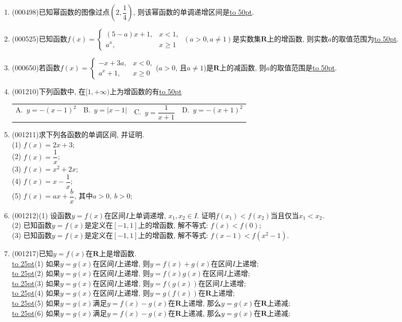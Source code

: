 \documentclass[10pt,a4paper]{article}
\newcommand{\blank}[1]{\underline{\hbox to #1pt{}}}
\newcommand{\fourch}[4]{\par\begin{tabular}{p{.23\textwidth}p{.23\textwidth}p{.23\textwidth}p{.23\textwidth}}
A.~#1 &B.~#2& C.~#3& D.~#4
\end{tabular}}
\begin{document}
\begin{enumerate}[1.]
\item {\tiny (000498)}已知幂函数的图像过点$(2,\dfrac14)$, 则该幂函数的单调递增区间是\blank{50}.
\item {\tiny (000525)}已知函数$f(x)=\begin{cases} (5-a)x+1, & x<1, \\ a^x, & x\ge 1\end{cases} \ (a>0,a\ne 1)$是实数集$\mathbf{R}$上的增函数, 则实数$a$的取值范围为\blank{50}.
\item {\tiny (000650)}若函数$f(x)=\begin{cases} -x+3a, & x<0,  \\ a^x+1, & x\ge 0 \end{cases}$($a>0$, 且$a\ne 1$)是$\mathbf{R}$上的减函数, 则$a$的取值范围是\blank{50}.
\item {\tiny (001210)}下列函数中, 在$[1,+\infty)$上为增函数的有\blank{50}
\fourch{$y=-(x-1)^2$}{$y=|x-1|$}{$y=\dfrac{1}{x+1}$}{$y=-(x+1)^2$}
\item {\tiny (001211)}求下列各函数的单调区间, 并证明.\\ 
(1) $f(x)=2x+3$;\\ 
(2) $f(x)=\dfrac{1}{x}$;\\ 
(3) $f(x)=x^2+2x$;\\ 
(4) $f(x)=x-\dfrac{1}{x}$;\\ 
(5) $f(x)=ax+\dfrac{b}{x}$, 其中$a>0, \ b>0$;
\item {\tiny (001212)}(1) 设函数$y=f(x)$在区间$I$上单调递增, $x_1,x_2\in I$. 证明$f(x_1)<f(x_2)$当且仅当$x_1<x_2$.\\ 
(2) 已知函数$y=f(x)$是定义在$[-1,1]$上的增函数, 解不等式: $f(x)<f(0)$;\\ 
(3) 已知函数$y=f(x)$是定义在$[-1,1]$上的增函数, 解不等式: $f(x-1)<f(x^2-1)$.
\item {\tiny (001217)}已知$y=f(x)$在$\mathbf{R}$上是增函数.\\ 
\blank{25}(1) 如果$y=g(x)$在区间$I$上递增, 则$y=f(x)+g(x)$在区间$I$上递增;\\ 
\blank{25}(2) 如果$y=g(x)$在区间$I$上递增, 则$y=f(x)g(x)$在区间$I$上递增;\\ 
\blank{25}(3) 如果$y=g(x)$在区间$I$上递增, 则$y=f(g(x))$在区间$I$上递增;\\ 
\blank{25}(4) 如果$y=g(x)$在区间$I$上递增, 则$y=g(f(x))$在$\mathbf{R}$上递增;\\ 
\blank{25}(5) 如果$y=g(x)$满足$y=f(x)-g(x)$在$\mathbf{R}$上递增, 那么$y=g(x)$在$\mathbf{R}$上递减;\\ 
\blank{25}(6) 如果$y=g(x)$满足$y=f(x)-g(x)$在$\mathbf{R}$上递减, 那么$y=g(x)$在$\mathbf{R}$上递减;\\ 

\end{enumerate}
\end{document}
